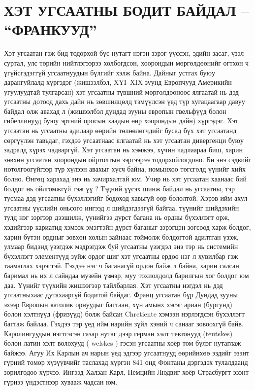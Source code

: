 \section{ХЭТ УГСААТНЫ БОДИТ БАЙДАЛ – “ФРАНКУУД”}
Хэт угсаатан гэж бид тодорхой бүс нутагт нэгэн зэрэг үүссэн, эдийн засаг, үзэл суртал, улс төрийн нийтлэгээрээ холбогдсон, хоорондын мөргөлдөөнийг огтхон ч үгүйсгэдэггүй угсаатнуудын бүлгийг хэлж байна.
Дайныг устгах буюу дарангуйлалд хүргэдэг (жишээлбэл, XYI–XIX зуунд Европчууд Америкийн угуулуудтай тулгарсан) хэт угсаатны түвшний мөргөлдөөнөөс ялгаатай нь дэд угсаатны дотоод дахь дайн нь зөвшилцөлд тэмүүлсэн үед түр хугацаагаар давуу байдал олж авахад л (жишээлбэл дундад зууны европын гвельфүүд болон гибеллинууд буюу эртний оросын хаадын өөр хоорондын дайн) хүргэдэг. Хэт угсаатан нь угсаатны адилаар өөрийн төлөөлөгчдийг бусад бүх хэт угсаатанд сөргүүлэн тавьдаг, гэхдээ угсаатнаас ялгаатай нь хэт угсаатан дивергенци буюу задралд хүрэх чадваргүй. Хэт угсаатан нь хэмжээ, хүчин чадлаараа биш, харин зөвхөн угсаатан хоорондын ойртолтын зэргээрээ тодорхойлогдоно. Би энэ сэдвийг нотолгоогүйгээр түр хүлээн авахыг хүсч байна, номынхоо төгсгөлд үүнийг хийх болно.
Өнгөц харахад энэ нь хачирхалтай юм. Учир нь хэт угсаатан хаанаас бий болдог нь ойлгомжгүй гэж үү ? Тэдний үүсэх шинж байдал нь угсаатны, тэр тусмаа дэд угсаатны бүхэллэгийг бодоход хавьгүй өөр бололтой. Хэрэв ийм ахул угсаатны үүслийн оньсого ингээд л шийдэгдээгүй байгаа, түүнийг шийдэхийн тулд нэг зэргээр дээшилж, үүнийгээ дүрст багана нь ордны бүхэллэгт орж, хэдийгээр кариатид хэмээх эмэгтэйн дүрст баганыг зэрэгцэн зогсоод харж болдог, харин бүтэн ордныг зөвхөн холын зайнаас тоймолж болдогтой адилтган үзэж, улмаар бидэнд үзэгдэж мэдрэгдэж буй угсаатны үзэгдэл энэ тэр нь системийн бүхэллэгт элементүүд зүйж ордог шиг хэт угсаатны ердөө нэг л хувилбар гэж таамаглах хэрэгтэй. Гэхдээ нэг ч баганагүй ордон байж л байна, харин салсан баримал нь их л сайндаа музейн үзмэр, муу тохиолдолд барилгын хог болдог юм даа. Үүнийг түүхийн жишээгээр тайлбарлая.
Хэт угсаатны нэгдэл нь дэд угсаатныхаас дутахааргүй бодитой байдаг. Франц угсаатан бүр Дундад зууны эхээр Европын католик орнуудыг багтаан, хүн амынх хэсэг ариан (бургунд) болон хэлтнүүд (фризүүд) болж байсан Chretiente хэмээн нэрлэгдсэн бүхэллэгт багтаж байлаа. Гэхдээ тэр үед ийм нарийн зүйл хэний ч санааг зовоохгүй байв. Каролингуудын нэгтгэсэн газар нутаг дээр герман хэлт тевтонууд (teutskes) болон латин хэлт волохууд ( welskes ) гэсэн угсаатны хоёр том бүлэг нутаглаж байжээ. Агуу Их Карлын ач нарын үед эдгээр угсаатнууд өөрийнхөө эздийг эзэнт гүрний төмөр хүзүүвчийг таслахад хүргэн 841 онд Фонтаны дэргэдэх тулалдаанд зорилгодоо хүрчээ. Ингээд Халзан Карл, Немцийн Людвиг хоёр Страсбургт эзэнт гүрнээ үндэстнээр хувааж чадсан юм.
